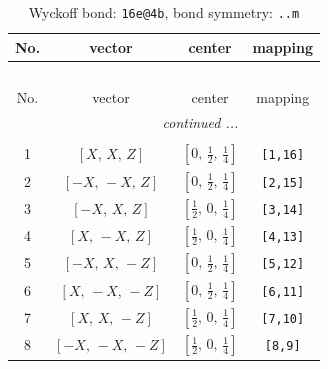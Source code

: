 \documentclass[fleqn,8pt]{jsarticle}
\begin{document}
\begin{longtable}{cccc}
\caption{Wyckoff bond: {\tt 16e@4b}, bond symmetry: {\tt ..m}}
 \\
 \hline \hline
No. & vector & center & mapping \\ \hline \endfirsthead

\multicolumn{3}{l}{\tablename\ \thetable{}} \\
 \hline \hline
No. & vector & center & mapping \\ \hline \endhead

 \hline \hline
\multicolumn{3}{r}{\footnotesize\it continued ...} \\ \endfoot

 \hline \hline
\multicolumn{3}{r}{} \\ \endlastfoot

1 & $\left[ X,\, X,\, Z \right]$ & $\left[ 0,\, \frac{1}{2},\, \frac{1}{4} \right]$ & {\tt [1,16]} \\ \hline
2 & $\left[ - X,\, - X,\, Z \right]$ & $\left[ 0,\, \frac{1}{2},\, \frac{1}{4} \right]$ & {\tt [2,15]} \\ \hline
3 & $\left[ - X,\, X,\, Z \right]$ & $\left[ \frac{1}{2},\, 0,\, \frac{1}{4} \right]$ & {\tt [3,14]} \\ \hline
4 & $\left[ X,\, - X,\, Z \right]$ & $\left[ \frac{1}{2},\, 0,\, \frac{1}{4} \right]$ & {\tt [4,13]} \\ \hline
5 & $\left[ - X,\, X,\, - Z \right]$ & $\left[ 0,\, \frac{1}{2},\, \frac{1}{4} \right]$ & {\tt [5,12]} \\ \hline
6 & $\left[ X,\, - X,\, - Z \right]$ & $\left[ 0,\, \frac{1}{2},\, \frac{1}{4} \right]$ & {\tt [6,11]} \\ \hline
7 & $\left[ X,\, X,\, - Z \right]$ & $\left[ \frac{1}{2},\, 0,\, \frac{1}{4} \right]$ & {\tt [7,10]} \\ \hline
8 & $\left[ - X,\, - X,\, - Z \right]$ & $\left[ \frac{1}{2},\, 0,\, \frac{1}{4} \right]$ & {\tt [8,9]} \\
\end{longtable}
\renewcommand{\arraystretch}{1.2}
\end{document}
